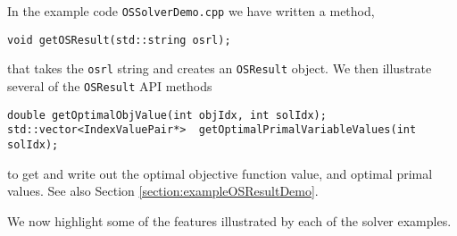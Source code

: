 \documentclass[11pt]{article}
\renewcommand{\_}{{\char"5F}}
\renewcommand{\{}{{\char"7B}}
\renewcommand{\}}{{\char"7D}}
\renewcommand{\^}{{\char"0D}}
\renewcommand{\'}{{\char"0D}}
\begin{document}
\begin{itemize}
In the example code {\tt OSSolverDemo.cpp} we have written a method,  

\begin{verbatim}
void getOSResult(std::string osrl);
\end{verbatim}

that takes the {\tt osrl} string and creates an {\tt OSResult} object.   
We then illustrate several of the {\tt OSResult} API methods 

\begin{verbatim}
double getOptimalObjValue(int objIdx, int solIdx);
std::vector<IndexValuePair*>  getOptimalPrimalVariableValues(int solIdx);
\end{verbatim}
to get and write out the optimal objective function value, and optimal primal values.  See also Section \ref{section:exampleOSResultDemo}.

\end{itemize}

We now highlight some of the features illustrated by each of the solver examples.
\end{document}
